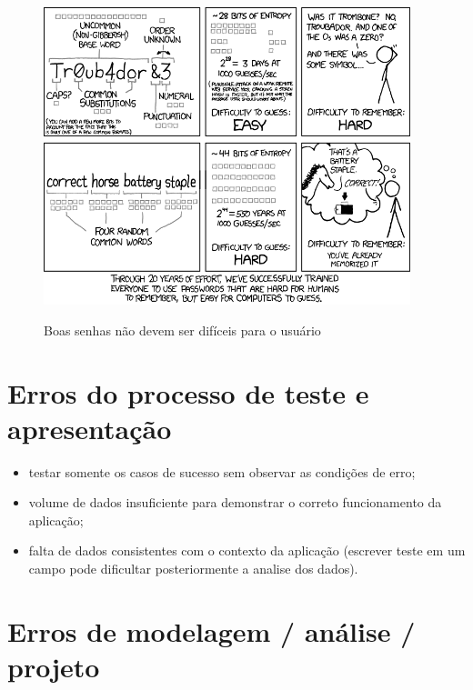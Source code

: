 \begin{figure}
    \centering
    \caption{Boas senhas não devem ser difíceis para o usuário}
	\includegraphics[width=0.95\textwidth]{erros/password_strength.png}
    \label{fig:password_strength}
\end{figure}


\section{Erros do processo de teste e apresentação}

\begin{itemize}

    \item testar somente os casos de sucesso sem observar as condições de erro;
    
    \item volume de dados insuficiente para demonstrar o correto funcionamento da aplicação;
    
    \item falta de dados consistentes com o contexto da aplicação (escrever teste em um campo pode dificultar posteriormente a analise dos dados).
    
\end{itemize}

\section{Erros de modelagem / análise / projeto}

